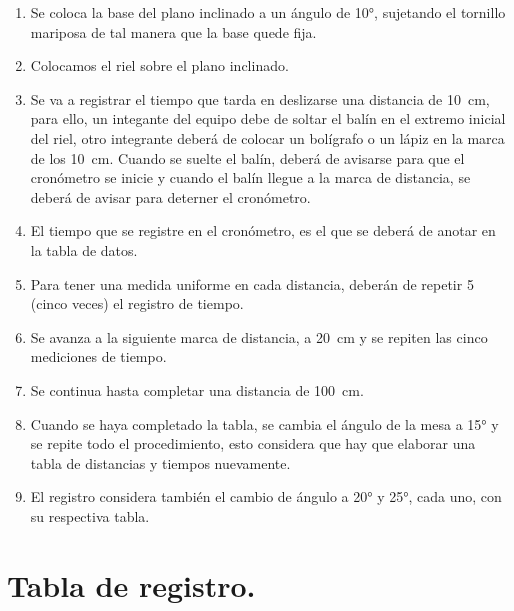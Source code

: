 \documentclass[14pt]{extarticle}
\begin{document}
\begin{enumerate}
\item Se coloca la base del plano inclinado a un ángulo de \ang{10}, sujetando el tornillo mariposa de tal manera que la base quede fija.
\item Colocamos el riel sobre el plano inclinado.
\item Se va a registrar el tiempo que tarda en deslizarse una distancia de \SI{10}{\centi\meter}, para ello, un integante del equipo debe de soltar el balín en el extremo inicial del riel, otro integrante deberá de colocar un bolígrafo o un lápiz en la marca de los \SI{10}{\centi\meter}. Cuando se suelte el balín, deberá de avisarse para que el cronómetro se inicie y cuando el balín llegue a la marca de distancia, se deberá de avisar para deterner el cronómetro.
\item El tiempo que se registre en el cronómetro, es el que se deberá de anotar en la tabla de datos.
\item Para tener una medida uniforme en cada distancia, deberán de repetir 5 (cinco veces) el registro de tiempo.
\item Se avanza a la siguiente marca de distancia, a \SI{20}{\centi\meter} y se repiten las cinco mediciones de tiempo.
\item Se continua hasta completar una distancia de \SI{100}{\centi\meter}.
\item Cuando se haya completado la tabla, se cambia el ángulo de la mesa a \ang{15} y se repite todo el procedimiento, esto considera que hay que elaborar una tabla de distancias y tiempos nuevamente.
\item El registro considera también el cambio de ángulo a \ang{20} y \ang{25}, cada uno, con su respectiva tabla.
\end{enumerate}

\section{Tabla de registro.}
\end{document}
